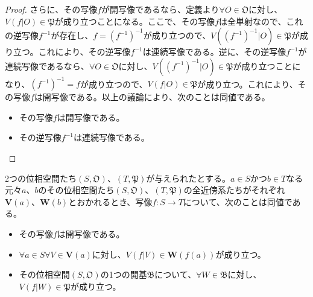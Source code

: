 \documentclass[dvipdfmx]{jsarticle}
\begin{document}
\begin{proof}
さらに、その写像$f$が開写像であるなら、定義より$\forall O \in \mathfrak{O}$に対し、$V\left( f|O \right) \in \mathfrak{P}$が成り立つことになる。ここで、その写像$f$は全単射なので、これの逆写像$f^{- 1}$が存在し、$f = \left( f^{- 1} \right)^{- 1}$が成り立つので、$V\left( \left( f^{- 1} \right)^{- 1}|O \right) \in \mathfrak{P}$が成り立つ。これにより、その逆写像$f^{- 1}$は連続写像である。逆に、その逆写像$f^{- 1}$が連続写像であるなら、$\forall O \in \mathfrak{O}$に対し、$V\left( \left( f^{- 1} \right)^{- 1}|O \right) \in \mathfrak{P}$が成り立つことになり、$\left( f^{- 1} \right)^{- 1} = f$が成り立つので、$V\left( f|O \right) \in \mathfrak{P}$が成り立つ。これにより、その写像$f$は開写像である。以上の議論により、次のことは同値である。
\begin{itemize}
\item
  その写像$f$は開写像である。
\item
  その逆写像$f^{- 1}$は連続写像である。
\end{itemize}
\end{proof}
\begin{thm}\label{8.1.3.6}
2つの位相空間たち$\left( S,\mathfrak{O} \right)$、$\left( T,\mathfrak{P} \right)$が与えられたとする。$a \in S$かつ$b \in T$なる元々$a$、$b$のその位相空間たち$\left( S,\mathfrak{O} \right)$、$\left( T,\mathfrak{P} \right)$の全近傍系たちがそれぞれ$\mathbf{V}(a)$、$\mathbf{W}(b)$とおかれるとき、写像$f:S \rightarrow T$について、次のことは同値である。
\begin{itemize}
\item
  その写像$f$は開写像である。
\item
  $\forall a \in S\forall V \in \mathbf{V}(a)$に対し、$V\left( f|V \right) \in \mathbf{W}\left( f(a) \right)$が成り立つ。
\item
  その位相空間$\left( S,\mathfrak{O} \right)$の1つの開基$\mathfrak{B}$について、$\forall W \in \mathfrak{B}$に対し、$V\left( f|W \right) \in \mathfrak{P}$が成り立つ。
\end{itemize}
\end{thm}
\end{document}
